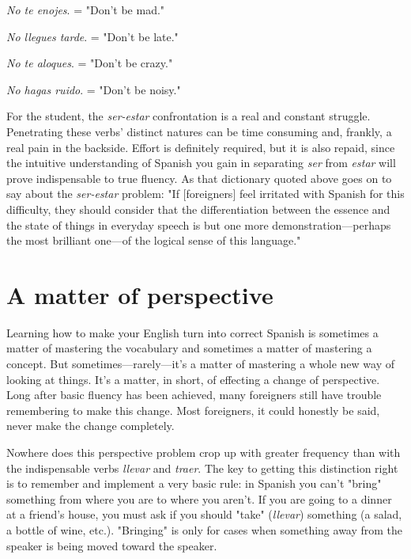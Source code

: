 \documentclass[14pt,a4paper,oneside]{memoir}
\newcommand{\bsk}{\vspace{20pt}}
\newcommand{\indu}{\hspace{20pt}}
\begin{document}
\bsk

\indu \emph{No te enojes}. = "Don't be mad."

\indu \emph{No llegues tarde}. = "Don't be late."

\indu \emph{No te aloques}. = "Don't be crazy."

\indu \emph{No hagas ruido}. = "Don't be noisy."

\bsk

For the student, the \emph{ser-estar} confrontation is a real and constant struggle. Penetrating these verbs' distinct natures can be time consuming and, frankly, a real pain in the backside. Effort is definitely
required, but it is also repaid, since the intuitive understanding of
Spanish you gain in separating \emph{ser} from \emph{estar} will prove indispensable
to true fluency. As that dictionary quoted above goes on to say about
the \emph{ser-estar} problem: "If [foreigners] feel irritated with Spanish for
this difficulty, they should consider that the differentiation between
the essence and the state of things in everyday speech is but one more
demonstration---perhaps the most brilliant one---of the logical sense
of this language."

\section{A matter of perspective}

Learning how to make your English turn into correct Spanish
is sometimes a matter of mastering the vocabulary and sometimes a
matter of mastering a concept. But sometimes---rarely---it's a matter of
mastering a whole new way of looking at things. It's a matter, in short,
of effecting a change of perspective. Long after basic fluency has been
achieved, many foreigners still have trouble remembering to make this
change. Most foreigners, it could honestly be said, never make the
change completely.

Nowhere does this perspective problem crop up with greater
frequency than with the indispensable verbs \emph{llevar} and \emph{traer}. The key
to getting this distinction right is to remember and implement a very
basic rule: in Spanish you can't "bring" something from where you are
to where you aren't. If you are going to a dinner at a friend's house, you
must ask if you should "take" (\emph{llevar}) something (a salad, a bottle of
wine, etc.). "Bringing" is only for cases when something away from the
speaker is being moved toward the speaker.
\end{document}
